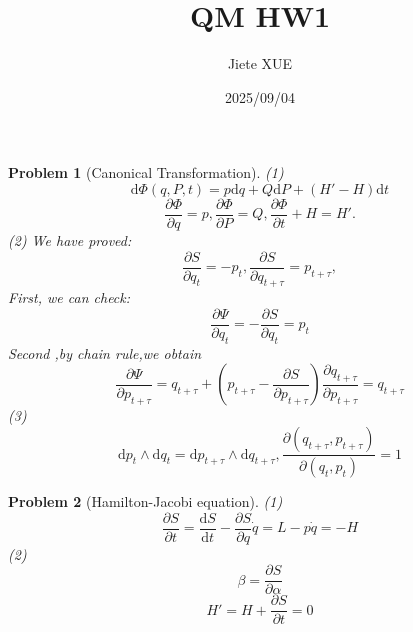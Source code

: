 \documentclass{article}
\title{QM HW1}
\author{Jiete XUE}
\date{2025/09/04}
\theoremstyle{t}
\newtheorem{problem}{Problem}
\newcommand{\dd}{\mathrm{d}}
\newcommand{\pa}{\partial}
\begin{document}
\maketitle
\begin{problem}[Canonical Transformation]
(1)\begin{equation}
   \dd \Phi(q,P,t)=p\dd q+Q\dd P+(H'-H)\dd t 
\end{equation}
\begin{equation}
    \frac{\partial \Phi}{\partial q}=p,\frac{\partial \Phi}{\partial P}=Q,\frac{\partial \Phi}{\partial t}+H=H'.
\end{equation}
(2) We have proved:
\begin{equation}
    \frac{\partial S}{\partial q_t}=-p_t,\frac{\partial S}{\partial q_{t+\tau}}=p_{t+\tau},
\end{equation}
First, we can check:
\begin{equation}
    \frac{\partial \Psi}{\partial q_t}=-\frac{\partial S}{\partial q_t}=p_t
\end{equation}
Second ,by chain rule,we obtain
\begin{equation}
    \frac{\partial \Psi }{\partial p_{t+\tau}}=q_{t+\tau}+\left( p_{t+\tau}-\frac{\partial S}{\partial p_{t+\tau}}\right)\frac{\partial q_{t+\tau}}{\partial p_{t+\tau}}=q_{t+\tau}
\end{equation}
(3) \begin{equation}
    \dd p_t\wedge\dd q_t=\dd p_{t+\tau}\wedge\dd q_{t+\tau},\frac{\partial(q_{t+\tau},p_{t+\tau})}{\partial(q_t,p_t)}=1
\end{equation}
\end{problem}
\begin{problem}[Hamilton-Jacobi equation]
    (1) \begin{equation}
        \frac{\pa S}{\pa t}=\frac{\dd S}{\dd t}-\frac{\pa S}{\pa q}\dot{q}=L-p\dot{q}=-H
    \end{equation}
    (2) \begin{equation}
        \beta=\frac{\pa S}{\pa \alpha}
    \end{equation}
    \begin{equation}
        H'=H+\frac{\pa S}{\pa t}=0
    \end{equation}
\end{problem}
\end{document}

